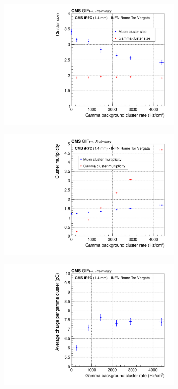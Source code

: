 	\begin{figure}[H]
		\begin{subfigure}{.5\linewidth}
		    \centering
			\includegraphics[width = \linewidth]{fig/chapt6/CMS-iRPC-INFN-ClusterSize_vs_Rate.pdf}
			\caption{\label{fig:iRPC_INFN_clust:A}}
		\end{subfigure}
		\begin{subfigure}{.5\linewidth}
		    \centering
			\includegraphics[width = \linewidth]{fig/chapt6/CMS-iRPC-INFN-ClusterMultiplicity_vs_Rate.pdf}
			\caption{\label{fig:iRPC_INFN_clust:B}}
		\end{subfigure}
		\begin{subfigure}{\linewidth}
		    \centering
			\includegraphics[width = .5\linewidth]{fig/chapt6/CMS-iRPC-INFN-GammaCharge_vs_Rate.pdf}

\end{subfigure}
\end{figure}
